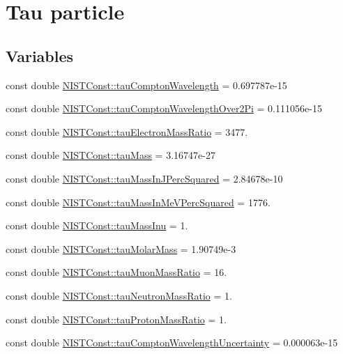 \hypertarget{group___tau}{}\section{Tau particle}
\label{group___tau}
\subsection*{Variables}
\begin{DoxyCompactItemize}
\item 
const double \hyperlink{group___tau_ga02608ef1c26b9550ee7547350bbcdd5d}{N\+I\+S\+T\+Const\+::tau\+Compton\+Wavelength} = 0.\+697787e-\/15
\item 
const double \hyperlink{group___tau_ga3cca663c9ba88e04346cbd29643aba14}{N\+I\+S\+T\+Const\+::tau\+Compton\+Wavelength\+Over2\+Pi} = 0.\+111056e-\/15
\item 
const double \hyperlink{group___tau_ga58efae35c13c681c03e115a97659063a}{N\+I\+S\+T\+Const\+::tau\+Electron\+Mass\+Ratio} = 3477.
\item 
const double \hyperlink{group___tau_gabb1b68dd381ed2582050fd991f210be8}{N\+I\+S\+T\+Const\+::tau\+Mass} = 3.\+16747e-\/27
\item 
const double \hyperlink{group___tau_gaa7d88675568d5ac0253714345b93c6f6}{N\+I\+S\+T\+Const\+::tau\+Mass\+In\+J\+Perc\+Squared} = 2.\+84678e-\/10
\item 
const double \hyperlink{group___tau_ga319bbad85ce875068b9e17a797f779cc}{N\+I\+S\+T\+Const\+::tau\+Mass\+In\+Me\+V\+Perc\+Squared} = 1776.
\item 
const double \hyperlink{group___tau_gaa0a5019135251853d2761cb9af892aea}{N\+I\+S\+T\+Const\+::tau\+Mass\+Inu} = 1.
\item 
const double \hyperlink{group___tau_ga07e317845454c4534cc0273efa2e55c6}{N\+I\+S\+T\+Const\+::tau\+Molar\+Mass} = 1.\+90749e-\/3
\item 
const double \hyperlink{group___tau_gac648100c94ae427f98a87390a9263379}{N\+I\+S\+T\+Const\+::tau\+Muon\+Mass\+Ratio} = 16.
\item 
const double \hyperlink{group___tau_ga024557c365e76b225bef98f0a0a9283b}{N\+I\+S\+T\+Const\+::tau\+Neutron\+Mass\+Ratio} = 1.
\item 
const double \hyperlink{group___tau_ga07236b2b11bdbfaee49e581a44bb01e8}{N\+I\+S\+T\+Const\+::tau\+Proton\+Mass\+Ratio} = 1.
\item 
const double \hyperlink{group___tau_ga05d2cb36c4bf4734ebedd983535cf27e}{N\+I\+S\+T\+Const\+::tau\+Compton\+Wavelength\+Uncertainty} = 0.\+000063e-\/15

\end{DoxyCompactItemize}
